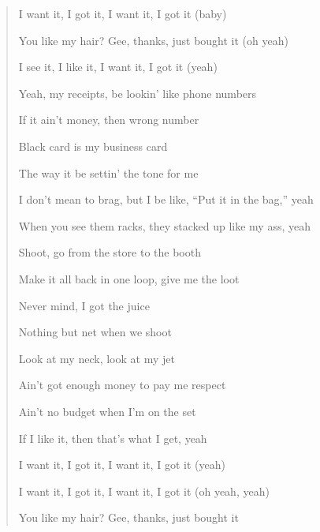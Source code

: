 \documentclass{article}
\begin{document}
\begin{enumerate}
\begin{quotation}
		I want it, I got it, I want it, I got it (baby)

		You like my hair? Gee, thanks, just bought it (oh yeah)

		I see it, I like it, I want it, I got it (yeah)

		Yeah, my receipts, be lookin' like phone numbers

		If it ain't money, then wrong number

		Black card is my business card

		The way it be settin' the tone for me

		I don't mean to brag, but I be like, ``Put it in the bag,'' yeah

		When you see them racks, they stacked up like my ass, yeah

		Shoot, go from the store to the booth

		Make it all back in one loop, give me the loot

		Never mind, I got the juice

		Nothing but net when we shoot

		Look at my neck, look at my jet

		Ain't got enough money to pay me respect

		Ain't no budget when I'm on the set

		If I like it, then that's what I get, yeah

		I want it, I got it, I want it, I got it (yeah)

		I want it, I got it, I want it, I got it (oh yeah, yeah)

		You like my hair? Gee, thanks, just bought it


\end{quotation}
\end{enumerate}
\end{document}
